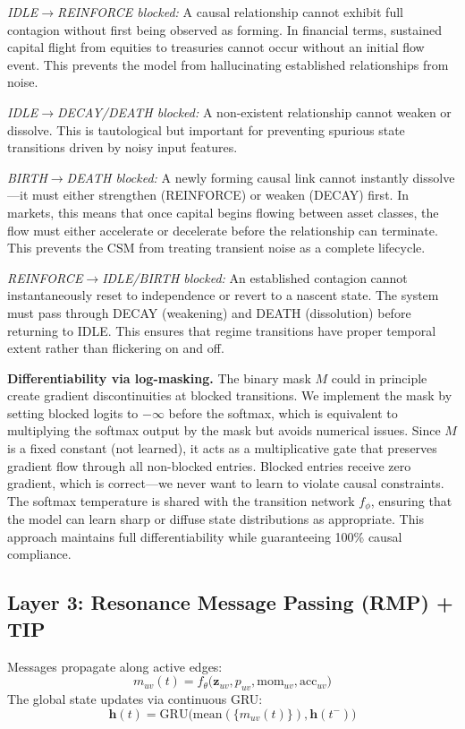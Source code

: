 \documentclass[11pt]{article}
\newcommand{\GRU}{\mathrm{GRU}}
\begin{document}
\emph{IDLE$\to$REINFORCE blocked:} A causal relationship cannot exhibit full contagion without first being observed as forming. In financial terms, sustained capital flight from equities to treasuries cannot occur without an initial flow event. This prevents the model from hallucinating established relationships from noise.

\emph{IDLE$\to$DECAY/DEATH blocked:} A non-existent relationship cannot weaken or dissolve. This is tautological but important for preventing spurious state transitions driven by noisy input features.

\emph{BIRTH$\to$DEATH blocked:} A newly forming causal link cannot instantly dissolve---it must either strengthen (REINFORCE) or weaken (DECAY) first. In markets, this means that once capital begins flowing between asset classes, the flow must either accelerate or decelerate before the relationship can terminate. This prevents the CSM from treating transient noise as a complete lifecycle.

\emph{REINFORCE$\to$IDLE/BIRTH blocked:} An established contagion cannot instantaneously reset to independence or revert to a nascent state. The system must pass through DECAY (weakening) and DEATH (dissolution) before returning to IDLE. This ensures that regime transitions have proper temporal extent rather than flickering on and off.

\textbf{Differentiability via log-masking.} The binary mask $M$ could in principle create gradient discontinuities at blocked transitions. We implement the mask by setting blocked logits to $-\infty$ before the softmax, which is equivalent to multiplying the softmax output by the mask but avoids numerical issues. Since $M$ is a fixed constant (not learned), it acts as a multiplicative gate that preserves gradient flow through all non-blocked entries. Blocked entries receive zero gradient, which is correct---we never want to learn to violate causal constraints. The softmax temperature is shared with the transition network $f_\phi$, ensuring that the model can learn sharp or diffuse state distributions as appropriate. This approach maintains full differentiability while guaranteeing 100\% causal compliance.

\subsection{Layer 3: Resonance Message Passing (RMP) + TIP}

Messages propagate along active edges:
\begin{equation}
    m_{uv}(t) = f_\theta\bigl(\mathbf{z}_{uv}, p_{uv}, \text{mom}_{uv}, \text{acc}_{uv}\bigr)
\end{equation}
The global state updates via continuous GRU:
\begin{equation}
    \mathbf{h}(t) = \GRU\bigl(\text{mean}(\{m_{uv}(t)\}), \mathbf{h}(t^-)\bigr)
\end{equation}
\end{document}
